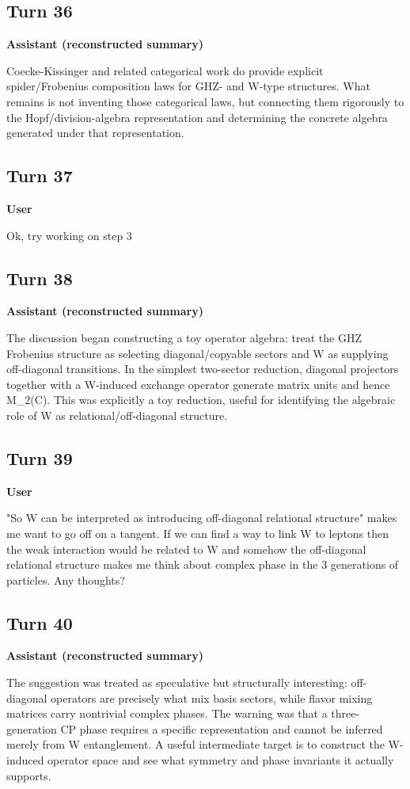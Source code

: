 \documentclass[11pt,a4paper]{article}
\newcommand{\speaker}[1]{\par\medskip\noindent\textbf{\large #1}\par\smallskip}
\begin{document}
\subsection*{Turn 36}
\speaker{Assistant (reconstructed summary)}
Coecke-Kissinger and related categorical work do provide explicit spider/Frobenius composition laws for GHZ- and W-type structures. What remains is not inventing those categorical laws, but connecting them rigorously to the Hopf/division-algebra representation and determining the concrete algebra generated under that representation.
\subsection*{Turn 37}
\speaker{User}
Ok, try working on step 3
\subsection*{Turn 38}
\speaker{Assistant (reconstructed summary)}
The discussion began constructing a toy operator algebra: treat the GHZ Frobenius structure as selecting diagonal/copyable sectors and W as supplying off-diagonal transitions. In the simplest two-sector reduction, diagonal projectors together with a W-induced exchange operator generate matrix units and hence M\_2(C). This was explicitly a toy reduction, useful for identifying the algebraic role of W as relational/off-diagonal structure.
\subsection*{Turn 39}
\speaker{User}
"So W can be interpreted as introducing off-diagonal relational structure" makes me want to go off on a tangent. If we can find a way to link W to leptons then the weak interaction would be related to W and somehow the off-diagonal relational structure makes me think about complex phase in the 3 generations of particles. Any thoughts?
\subsection*{Turn 40}
\speaker{Assistant (reconstructed summary)}
The suggestion was treated as speculative but structurally interesting: off-diagonal operators are precisely what mix basis sectors, while flavor mixing matrices carry nontrivial complex phases. The warning was that a three-generation CP phase requires a specific representation and cannot be inferred merely from W entanglement. A useful intermediate target is to construct the W-induced operator space and see what symmetry and phase invariants it actually supports.
\end{document}
